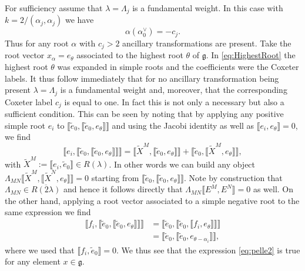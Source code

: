 For sufficiency assume that $\lambda=\Lambda_j$ is a fundamental weight. In this case with $k=2/(\alpha_j,\alpha_j)$ we have
\begin{equation}
    \alpha(\alpha_0^\vee) = -c_j.
\end{equation}
Thus for any root $\alpha$ with $c_j>2$ ancillary transformations are present. Take the root vector $x_\alpha = e_\theta$ associated to the highest root $\theta$ of $\mathfrak{g}$. In \eqref{eq:HighestRoot} the highest root $\theta$ was expanded in simple roots and the coefficients were the Coxeter labels. It thus follow immediately that for no ancillary transformation being present $\lambda=\Lambda_j$ is a fundamental weight and, moreover, that the corresponding Coxeter label $c_j$ is equal to one. In fact this is not only a necessary but also a sufficient condition. This can be seen by noting that by applying any positive simple root $e_i$ to $\llbracket \tilde{e}_0,\llbracket\tilde{e}_0,e_\theta\rrbracket\rrbracket$ and using the Jacobi identity as well as $\llbracket e_i,e_\theta\rrbracket=0$, we find 
\begin{equation}\label{eq:pelle2}
    \llbracket e_i, \llbracket \tilde{e}_0,\llbracket\tilde{e}_0,e_\theta\rrbracket\rrbracket\rrbracket = \llbracket\tilde{X}^M,\llbracket\tilde{e}_0,e_\theta\rrbracket\rrbracket+\llbracket\tilde{e}_0,\llbracket\tilde{X}^M,e_\theta\rrbracket\rrbracket,
\end{equation}
with $\tilde{X}^M:=\llbracket e_i,\tilde{e}_0\rrbracket\in R(\lambda)$. In other words we can build any object $\Lambda_{MN}\llbracket \tilde{X}^M,\llbracket\tilde{X}^N,e_\theta\rrbracket\rrbracket=0$ starting from $\llbracket\tilde{e}_0,\llbracket\tilde{e}_0,e_\theta\rrbracket\rrbracket$. Note by construction that $\Lambda_{MN}\in \overbar{R(2\lambda)}$ and hence it follows directly that $\Lambda_{MN}\llbracket E^M,E^N\rrbracket=0$ as well. On the other hand, applying a root vector associated to a simple negative root to the same expression we find 
\begin{equation}
    \begin{aligned}
        \llbracket f_i,\llbracket \tilde{e}_0,\llbracket\tilde{e}_0,e_\theta\rrbracket\rrbracket\rrbracket &= \llbracket \tilde{e}_0,\llbracket\tilde{e}_0,\llbracket f_i,e_\theta\rrbracket\rrbracket\rrbracket\\
        &= \llbracket\tilde{e}_0,\llbracket\tilde{e}_0,e_{\theta-\alpha_i}\rrbracket\rrbracket,
        \end{aligned}
\end{equation}
where we used that $\llbracket f_i,\tilde{e}_0\rrbracket=0$. We thus see that the expression \eqref{eq:pelle2} is true for any element $x\in\mathfrak{g}$. 

